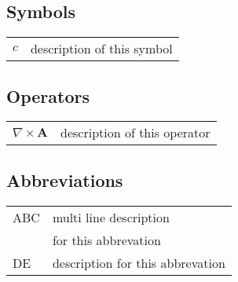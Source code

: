 
\subsection*{Symbols}

\begin{tabular}{ll}
$c$              & description of this symbol\\
\end{tabular}

\subsection*{Operators}

\begin{tabular}{ll}
$\nabla \times \mathbf{A}$              & description of this operator\\
\end{tabular}

\subsection*{Abbreviations}

\begin{tabular}{ll}
ABC      & multi line description \\
           & for this abbrevation \\
DE        & description for this abbrevation \\
\end{tabular}
